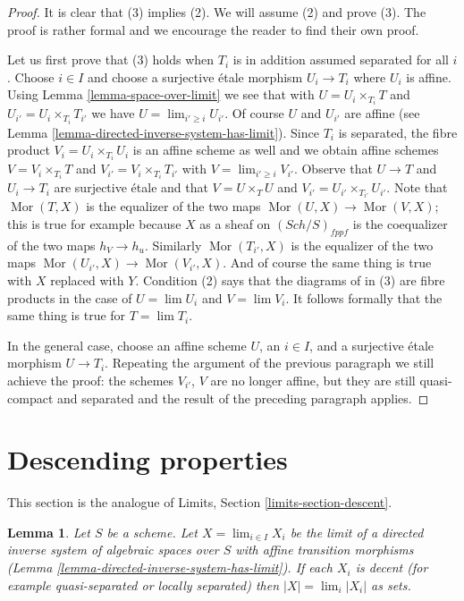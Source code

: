 \documentclass{stacks-project}
\theoremstyle{plain}
\newtheorem{lemma}[subsection]{Lemma}
\theoremstyle{definition}
\theoremstyle{remark}
\numberwithin{equation}{subsection}
\def\lim{\mathop{\mathrm{lim}}\nolimits}
\def\Sch{\mathit{Sch}}
\def\Mor{\mathop{\mathrm{Mor}}\nolimits}
\begin{document}
\begin{proof}
It is clear that (3) implies (2). We will assume (2) and prove (3).
The proof is rather formal and we encourage the reader to find their
own proof.

\medskip\noindent
Let us first prove that (3) holds
when $T_i$ is in addition assumed separated for all $i$.
Choose $i \in I$ and choose a surjective \'etale morphism $U_i \to T_i$
where $U_i$ is affine. Using Lemma \ref{lemma-space-over-limit}
we see that with $U = U_i \times_{T_i} T$ and
$U_{i'} = U_i \times_{T_i} T_{i'}$ we have $U = \lim_{i' \geq i} U_{i'}$.
Of course $U$ and $U_{i'}$ are affine (see
Lemma \ref{lemma-directed-inverse-system-has-limit}).
Since $T_i$ is separated, the fibre product $V_i = U_i \times_{T_i} U_i$
is an affine scheme as well and we obtain affine schemes
$V = V_i \times_{T_i} T$ and
$V_{i'} = V_i \times_{T_i} T_{i'}$ with $V = \lim_{i' \geq i} V_{i'}$.
Observe that $U \to T$ and $U_i \to T_i$ are surjective \'etale and
that $V = U \times_T U$ and $V_{i'} = U_{i'} \times_{T_{i'}} U_{i'}$.
Note that $\Mor(T, X)$ is the equalizer of the two maps
$\Mor(U, X) \to \Mor(V, X)$; this is true for example because
$X$ as a sheaf on $(\Sch/S)_{fppf}$ is the coequalizer
of the two maps $h_V \to h_u$. Similarly
$\Mor(T_{i'}, X)$ is the equalizer of the
two maps $\Mor(U_{i'}, X) \to \Mor(V_{i'}, X)$.
And of course the same thing is true with $X$ replaced with $Y$.
Condition (2) says that the diagrams of in (3) are fibre products
in the case of $U = \lim U_i$ and $V = \lim V_i$.
It follows formally that the same thing is true for $T = \lim T_i$.

\medskip\noindent
In the general case, choose an affine scheme $U$, an $i \in I$,
and a surjective \'etale morphism $U \to T_i$. Repeating the
argument of the previous paragraph we still achieve the proof:
the schemes $V_{i'}$, $V$ are no longer affine, but they are
still quasi-compact and
separated and the result of the preceding paragraph applies.
\end{proof}




\section{Descending properties}
\label{section-descent}

\noindent
This section is the analogue of Limits, Section \ref{limits-section-descent}.

\begin{lemma}
\label{lemma-inverse-limit-sets}
Let $S$ be a scheme. Let $X = \lim_{i \in I} X_i$ be the limit of a directed
inverse system of algebraic spaces over $S$ with affine transition morphisms
(Lemma \ref{lemma-directed-inverse-system-has-limit}). If each $X_i$
is decent (for example quasi-separated or locally separated)
then $|X| = \lim_i |X_i|$ as sets.
\end{lemma}
\end{document}
